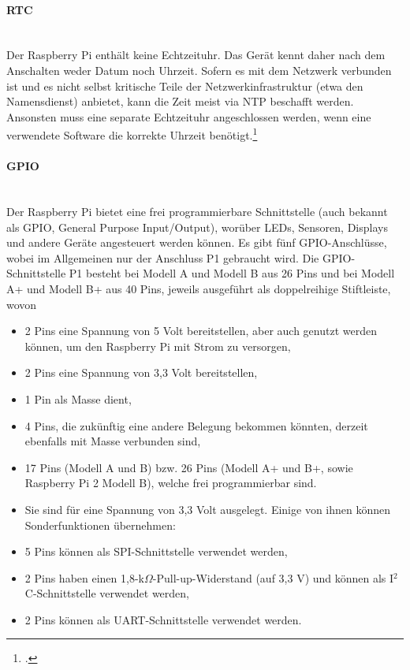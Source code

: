 \paragraph{RTC}\ \\

Der Raspberry Pi enthält keine Echtzeituhr. Das Gerät kennt daher nach dem Anschalten weder Datum noch Uhrzeit. Sofern es mit dem Netzwerk verbunden ist und es nicht selbst kritische Teile der Netzwerkinfrastruktur (etwa den Namensdienst) anbietet, kann die Zeit meist via NTP beschafft werden. Ansonsten muss eine separate Echtzeituhr angeschlossen werden, wenn eine verwendete Software die korrekte Uhrzeit benötigt.\footcite{shit_raspi}

\paragraph{GPIO}\ \\

Der Raspberry Pi bietet eine frei programmierbare Schnittstelle (auch bekannt als GPIO, General Purpose Input/Output), worüber LEDs, Sensoren, Displays und andere Geräte angesteuert werden können. Es gibt fünf GPIO-Anschlüsse, wobei im Allgemeinen nur der Anschluss P1 gebraucht wird. Die GPIO-Schnittstelle P1 besteht bei Modell A und Modell B aus 26 Pins und bei Modell A+ und Modell B+ aus 40 Pins, jeweils ausgeführt als doppelreihige Stiftleiste, wovon\\

\begin{itemize}
\item 2 Pins eine Spannung von 5 Volt bereitstellen, aber auch genutzt werden können, um den Raspberry Pi mit Strom zu versorgen,
\item 2 Pins eine Spannung von 3,3 Volt bereitstellen,
\item 1 Pin als Masse dient,
\item 4 Pins, die zukünftig eine andere Belegung bekommen könnten, derzeit ebenfalls mit Masse verbunden sind,
\item 17 Pins (Modell A und B) bzw. 26 Pins (Modell A+ und B+, sowie Raspberry Pi 2 Modell B), welche frei programmierbar sind. \item Sie sind für eine Spannung von 3,3 Volt ausgelegt. Einige von ihnen können Sonderfunktionen übernehmen:
\item 5 Pins können als SPI-Schnittstelle verwendet werden,
\item 2 Pins haben einen 1,8-k$\Omega$-Pull-up-Widerstand (auf 3,3 V) und können als I$^2$C-Schnittstelle verwendet werden,
\item 2 Pins können als UART-Schnittstelle verwendet werden.
\end{itemize}
\noindent

